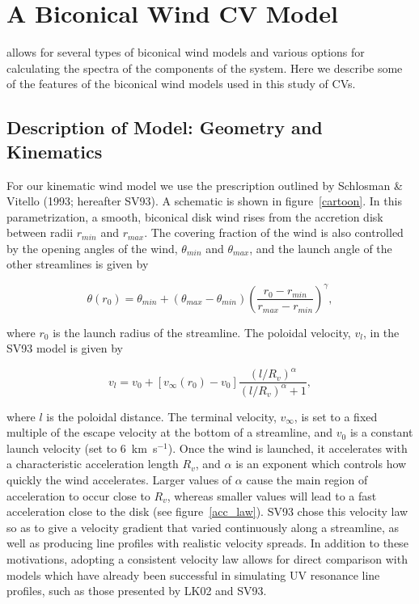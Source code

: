 \documentclass[preprint, a4paper, 11pt]{aastex}
\begin{document}
{\section{A Biconical Wind CV Model}

\py allows for several types of biconical wind models and various options for calculating the spectra of the components of the system.
Here we describe some of the features of the  biconical wind models used in this study of CVs. 

\subsection{Description of Model: Geometry and Kinematics}

For our kinematic wind model we use 
the prescription outlined by Schlosman \& Vitello (1993; hereafter SV93). A schematic is shown
in figure~\ref{cartoon}. In this parametrization, a smooth, biconical
disk wind rises from the accretion disk between radii $r_{min}$ and $r_{max}$. The covering fraction of the wind is 
also controlled by the opening angles of the wind, $\theta_{min}$ and $\theta_{max}$, and the launch angle of
the other streamlines is given by

\begin{equation}
\theta(r_0) = \theta_{min} + (\theta_{max} - \theta_{min}) \left(\frac{r_0 - r_{min}}{r_{max} - r_{min}} \right)^{\gamma},
\label{theta}
\end{equation}

where $r_0$ is the launch radius of the streamline.
The poloidal velocity, $v_l$, in the SV93 model is given by

\begin{equation}
v_l=v_0+\left[v_{\infty}(r_0)-v_0\right]\frac{\left(l/R_v\right)^{\alpha}}{\left(l/R_v\right)^{\alpha}+1},
\label{v_law}
\end{equation}

where $l$ is the poloidal distance. The terminal velocity, 
$v_{\infty}$, is set to a fixed multiple of the escape velocity at the bottom
of a streamline, and $v_0$ is a constant launch velocity (set to $6$~km~s$^{-1}$).
Once the wind is launched, it accelerates with a characteristic acceleration
length $R_v$, and $\alpha$ is an exponent which controls how quickly the 
wind accelerates. Larger values of $\alpha$ cause the main region of 
acceleration to occur close to $R_v$, whereas smaller values will lead
to a fast acceleration close to the disk (see figure~\ref{acc_law}).
SV93 chose this velocity law so as to give a 
velocity gradient that varied continuously along a streamline, as well
as producing line profiles with realistic velocity spreads.
In addition to these motivations, adopting a consistent velocity law 
allows for direct comparison with models which have already been successful in 
simulating UV resonance line profiles, such as those presented by LK02 and SV93.  


}
\end{document}
